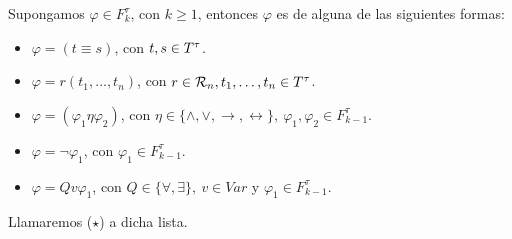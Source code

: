   \begin{lemma} \label{lemma_36}
    \PN Supongamos $\varphi \in F_{k}^{\tau}$, con $k \geq 1$, entonces $\varphi$ es de alguna de las siguientes formas:
    \begin{itemize}
      \item $\varphi = (t \equiv s)$, con $t, s \in T^{\tau}$.
      \item $\varphi = r(t_{1}, \dotsc, t_{n})$, con $r \in \mathcal{R}_{n}, t_{1}, \dotsc, t_{n} \in T^{\tau}$.
      \item $\varphi = (\varphi_{1} \eta \varphi_{2})$, con $\eta \in \{\wedge, \vee, \rightarrow, \leftrightarrow\}, \
        \varphi_{1}, \varphi_{2} \in F_{k-1}^{\tau}$.
      \item $\varphi = \lnot \varphi_{1}$, con $\varphi_{1} \in F_{k-1}^{\tau}$.
      \item $\varphi = Qv\varphi_{1}$, con $Q \in \{\forall, \exists\}, \ v \in Var$ y $\varphi_{1} \in F_{k-1}^{\tau}$.
    \end{itemize}

    \PN Llamaremos ($\star$) a dicha lista.
  \end{lemma}
